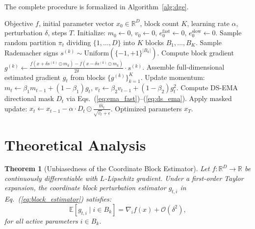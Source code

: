 \documentclass[11pt,a4paper]{article}
\newtheorem{theorem}{Theorem}
\begin{document}
The complete procedure is formalized in Algorithm~\ref{alg:dge}.

\begin{algorithm}[t]
\caption{\textbf{Denoised Gradient Estimation (DGE)}}
\label{alg:dge}
\begin{algorithmic}[1]
\REQUIRE Objective $f$, initial parameter vector $x_0 \in \mathbb{R}^D$, block count $K$, learning rate $\alpha$, perturbation $\delta$, steps $T$.
\STATE Initialize: $m_0 \leftarrow 0$, $v_0 \leftarrow 0$, $e_0^{\text{fast}} \leftarrow 0$, $e_0^{\text{slow}} \leftarrow 0$.
    \STATE Sample random partition $\pi_t$ dividing $\{1, \dots, D\}$ into $K$ blocks $B_1, \dots, B_K$.
        \STATE Sample Rademacher signs $s^{(k)} \sim \text{Uniform}(\{-1, +1\}^{|B_k|})$.
        \STATE Compute block gradient $g^{(k)} \leftarrow \frac{f(x + \delta s^{(k)} \odot m_k) - f(x - \delta s^{(k)} \odot m_k)}{2\delta} \cdot s^{(k)}$.
    \ENDFOR
    \STATE Assemble full-dimensional estimated gradient $g_t$ from blocks $\{g^{(k)}\}_{k=1}^K$.
    \STATE Update momentum: $m_t \leftarrow \beta_1 m_{t-1} + (1-\beta_1) g_t$, \quad $v_t \leftarrow \beta_2 v_{t-1} + (1-\beta_2) g_t^2$.
    \STATE Compute DS-EMA directional mask $D_t$ via Eqs.~(\ref{eq:ema_fast})--(\ref{eq:ds_ema}).
    \STATE Apply masked update: $x_t \leftarrow x_{t-1} - \alpha \cdot D_t \odot \frac{\hat{m}_t}{\sqrt{\hat{v}_t} + \epsilon}$.
\ENDFOR
\RETURN Optimized parameters $x_T$.
\end{algorithmic}
\end{algorithm}

\section{Theoretical Analysis}
\label{sec:theory}

\begin{theorem}[Unbiasedness of the Coordinate Block Estimator]
\label{thm:unbiased}
Let $f: \mathbb{R}^D \to \mathbb{R}$ be continuously differentiable with $L$-Lipschitz gradient. Under a first-order Taylor expansion, the coordinate block perturbation estimator $g_{t,i}$ in Eq.~(\ref{eq:block_estimator}) satisfies:
\begin{equation}
    \mathbb{E}[g_{t,i} \mid i \in B_k] = \nabla_i f(x) + \mathcal{O}(\delta^2),
\end{equation}
for all active parameters $i \in B_k$.
\end{theorem}
\end{document}

